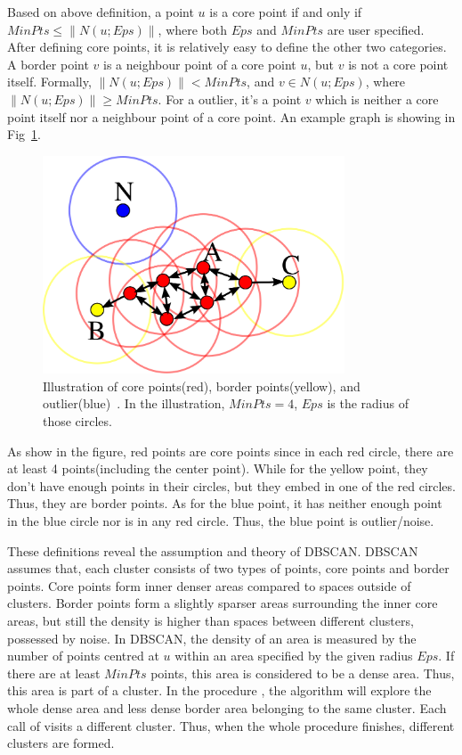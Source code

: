 Based on above definition, a point $u$ is a core point if and only if $MinPts \leq \|N(u;Eps)\|$, where both $Eps$ and $MinPts$ are user specified. After defining core points, it is relatively easy to define the other two categories. A border point $v$ is a neighbour point of a core point $u$, but $v$ is not a core point itself. Formally, $\|N(u;Eps)\| < MinPts$, and $v \in N(u;Eps)$, where $\|N(u;Eps)\| \geq MinPts$. For a outlier, it's a point $v$ which is neither a core point itself nor a neighbour point of a core point. An example graph is showing in Fig~\ref{fig:DBSCANConcept}.

\begin{figure}[ht]
	\begin{center}
		\includegraphics[width=0.8\textwidth]{images/DBSCAN-Illustration.png}
		\caption{Illustration of core points(red), border points(yellow), and outlier(blue)~\cite{wiki:DBSCAN}. In the illustration, $MinPts = 4$, $Eps$ is the radius of those circles.}
		\label{fig:DBSCANConcept}
	\end{center}
\end{figure}

As show in the figure, red points are core points since in each red circle, there are at least 4 points(including the center point). While for the yellow point, they don't have enough points in their circles, but they embed in one of the red circles. Thus, they are border points. As for the blue point, it has neither enough point in the blue circle nor is in any red circle. Thus, the blue point is outlier/noise.

These definitions reveal the assumption and theory of DBSCAN. DBSCAN assumes that, each cluster consists of two types of points, core points and border points. Core points form inner denser areas compared to spaces outside of clusters. Border points form a slightly sparser areas surrounding the inner core areas, but still the density is higher than spaces between different clusters, possessed by noise. In DBSCAN, the density of an area is measured by the number of points centred at $u$ within an area specified by the given radius $Eps$. If there are at least $MinPts$ points, this area is considered to be a dense area. Thus, this area is part of a cluster. In the procedure , the algorithm will explore the whole dense area and less dense border area belonging to the same cluster. Each call of  visits a different cluster. Thus, when the whole procedure  finishes, different clusters are formed.

